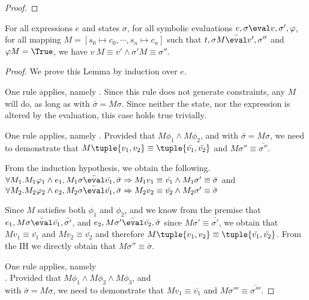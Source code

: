 \begin{proof}
\end{proof}


\begin{lemma}
  \label{lem:soundeval}

  For all expressions $e$ and states $\sigma$,
  for all symbolic evaluations $e,\sigma\eval v,\sigma',\phi$,
  for all mapping $M=[s_0\mapsto c_0,\cdots,s_n\mapsto c_n]$
  such that $t,\sigma M \bar{\eval}v',\sigma''$ and $\phi M = \True$,
  we have $v\ M \equiv v' \wedge \sigma' M \equiv \sigma''$.

\end{lemma}

\begin{proof}
  We prove this Lemma by induction over $e$.

  {One rule applies, namely .
  Since this rule does not generate constraints, any $M$ will do, as long as  with $\bar{\sigma}=M \sigma$. Since neither the state, nor the expression is altered by the evaluation, this case holds true trivially.}

  {One rule applies, namely .
  Provided that $M\phi_1\wedge M\phi_2$, and  with $\bar{\sigma}=M\sigma$,
  we need to demonstrate that $M\tuple{v_1,v_2} \equiv \tuple{\bar{v_1},\bar{v_2}}$ and $M\sigma''\equiv\bar{\sigma''}$.

  From the induction hypothesis, we obtain the following. $\forall M_1 .  M_1\phi_1 \wedge e_1, M_1\sigma \bar{\eval}\bar{v_1},\bar{\sigma}\implies  M_1v_1\equiv \bar{v_1} \wedge  M_1\sigma'\equiv\bar{\sigma}$ and
  $\forall M_2 . M_2\phi_2 \wedge e_2,M_2\sigma \bar{\eval}\bar{v_1},\bar{\sigma}\implies M_2v_2\equiv \bar{v_2} \wedge M_2\sigma'\equiv\bar{\sigma}$

  Since $M$ satisfies both $\phi_1$ and $\phi_2$,
  and we know from the premise that $e_1,M\sigma \bar{\eval}\bar{v_1},\bar{\sigma'}$,
  and $e_2,M\sigma'\bar{\eval}\bar{v_2},\bar{\sigma}$ since $M\sigma'\equiv \bar{\sigma'}$,
  we obtain that $M v_1\equiv \bar{v_1}$ and $M v_2 \equiv \bar{v_2}$ and therefore $M\tuple{v_1,v_2} \equiv \tuple{\bar{v_1},\bar{v_2}}$.
  From the IH we directly obtain that $M \sigma'' \equiv\bar{\sigma}$.
  }

  {One rule applies, namely\\
  .
  Provided that $M\phi_1 \land M\phi_2\land M\phi_3$, and\\
   with $\bar{\sigma}=M\sigma$,
  we need to demonstrate that $M v_1 \equiv \bar{v_1}$ and $M\sigma'''\equiv\bar{\sigma'''}$.

}
\end{proof}
